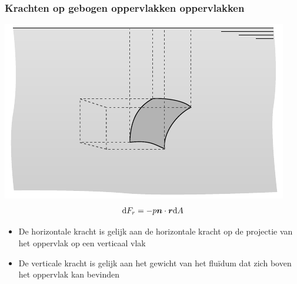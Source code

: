 \documentclass[t]{beamer}
\begin{document}
  		\begin{frame}
			\frametitle{Krachten op gebogen oppervlakken oppervlakken}
			\center
			\includegraphics[scale=0.9]{../fig/hydrostatica/kracht_gebogen_oppervlak_vereenvoudigd_3d}
			\pause
			\vspace{-0.5cm}
			\begin{equation}
				\mathrm{d} F_r = -p \boldsymbol{n} \cdot \boldsymbol{r} \mathrm{d} A
			\end{equation}
			\vspace{-0.7cm}
			\begin{itemize}
				\pause
				\item De horizontale kracht is gelijk aan de horizontale kracht op de projectie van het oppervlak op een verticaal vlak
				\pause
				\item De verticale kracht is gelijk aan het gewicht van het fluïdum dat zich boven het oppervlak kan bevinden
			\end{itemize}
  		\end{frame}
\end{document}
